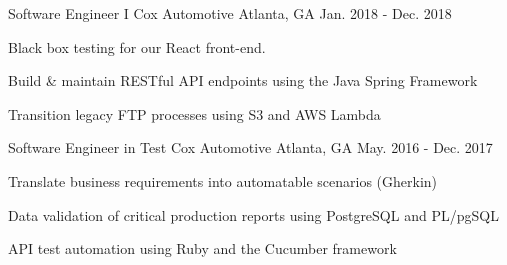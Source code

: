 \begin{cventries}
  \cventry
    {Software Engineer I} %
    {Cox Automotive} %
    {Atlanta, GA} %
    {Jan. 2018 - Dec. 2018} %
    {
      \begin{cvitems} %
        \item {Black box testing for our React front-end.}
        \item {Build \& maintain RESTful API endpoints using the Java Spring Framework}
        \item {Transition legacy FTP processes using S3 and AWS Lambda}
      \end{cvitems}
    }
    
  \cventry
    {Software Engineer in Test} %
    {Cox Automotive} %
    {Atlanta, GA} %
    {May. 2016 - Dec. 2017} %
    {
      \begin{cvitems} %
        \item {Translate business requirements into automatable scenarios (Gherkin)}
        \item {Data validation of critical production reports using PostgreSQL and PL/pgSQL}
        \item {API test automation using Ruby and the Cucumber framework}
      \end{cvitems}
    }
\end{cventries}
